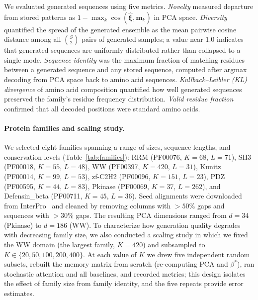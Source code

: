 We evaluated generated sequences using five metrics. \emph{Novelty} measured departure from stored patterns as $1 - \max_k \cos(\hat{\boldsymbol{\xi}}, \mathbf{m}_k)$ in PCA space. \emph{Diversity} quantified the spread of the generated ensemble as the mean pairwise cosine distance among all $\binom{S}{2}$ pairs of generated samples; a value near $1.0$ indicates that generated sequences are uniformly distributed rather than collapsed to a single mode. \emph{Sequence identity} was the maximum fraction of matching residues between a generated sequence and any stored sequence, computed after argmax decoding from PCA space back to amino acid sequences. \emph{Kullback--Leibler (KL) divergence} of amino acid composition quantified how well generated sequences preserved the family's residue frequency distribution. \emph{Valid residue fraction} confirmed that all decoded positions were standard amino acids.

\paragraph{Protein families and scaling study.}
We selected eight families spanning a range of sizes, sequence lengths, and conservation levels (Table~\ref{tab:families}): RRM (PF00076, $K{=}68$, $L{=}71$), SH3 (PF00018, $K{=}55$, $L{=}48$), WW (PF00397, $K{=}420$, $L{=}31$), Kunitz (PF00014, $K{=}99$, $L{=}53$), zf-C2H2 (PF00096, $K{=}151$, $L{=}23$), PDZ (PF00595, $K{=}44$, $L{=}83$), Pkinase (PF00069, $K{=}37$, $L{=}262$), and Defensin\_beta (PF00711, $K{=}45$, $L{=}36$). Seed alignments were downloaded from InterPro~\cite{mistryPfamProteinFamilies2021} and cleaned by removing columns with $>50\%$ gaps and sequences with $>30\%$ gaps. The resulting PCA dimensions ranged from $d{=}34$ (Pkinase) to $d{=}186$ (WW). To characterize how generation quality degrades with decreasing family size, we also conducted a scaling study in which we fixed the WW domain (the largest family, $K{=}420$) and subsampled to $K \in \{20, 50, 100, 200, 400\}$. At each value of $K$ we drew five independent random subsets, rebuilt the memory matrix from scratch (re-computing PCA and $\beta^*$), ran stochastic attention and all baselines, and recorded metrics; this design isolates the effect of family size from family identity, and the five repeats provide error estimates.

